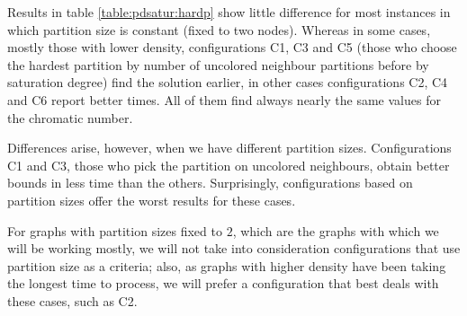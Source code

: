 \begin{itemize}
\end{itemize}

Results in table \ref{table:pdsatur:hardp} show little difference for most instances in which partition size is constant (fixed to two nodes). Whereas in some cases, mostly those with lower density, configurations C1, C3 and C5 (those who choose the hardest partition by number of uncolored neighbour partitions before by saturation degree) find the solution earlier, in other cases configurations C2, C4 and C6 report better times. All of them find always nearly the same values for the chromatic number.

Differences arise, however, when we have different partition sizes. Configurations C1 and C3, those who pick the partition on uncolored neighbours, obtain better bounds in less time than the others. Surprisingly, configurations based on partition sizes offer the worst results for these cases.

For graphs with partition sizes fixed to $2$, which are the graphs with which we will be working mostly, we will not take into consideration configurations that use partition size as a criteria; also, as graphs with higher density have been taking the longest time to process, we will prefer a configuration that best deals with these cases, such as C2.

